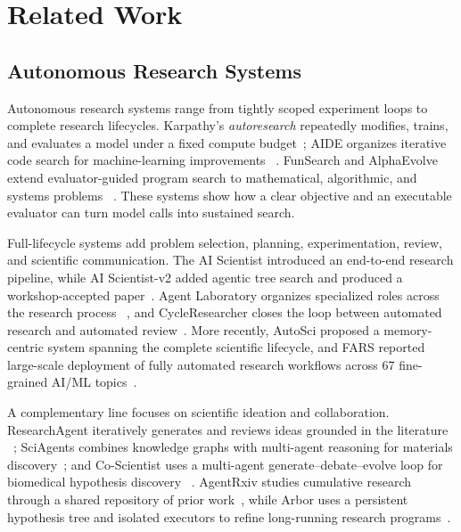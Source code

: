 \section{Related Work}
\label{sec:related}

\subsection{Autonomous Research Systems}

Autonomous research systems range from tightly scoped experiment loops to complete
research lifecycles. Karpathy's \emph{autoresearch} repeatedly modifies, trains, and
evaluates a model under a fixed compute budget~\citep{karpathy_autoresearch}; AIDE
organizes iterative code search for machine-learning improvements
~\citep{jiang2025aide}. FunSearch and AlphaEvolve extend evaluator-guided program
search to mathematical, algorithmic, and systems problems
~\citep{romera2024funsearch,novikov2025alphaevolve}. These systems show how a clear
objective and an executable evaluator can turn model calls into sustained search.

Full-lifecycle systems add problem selection, planning, experimentation, review,
and scientific communication. The AI Scientist introduced an end-to-end research
pipeline, while AI Scientist-v2 added agentic tree search and produced a
workshop-accepted paper~\citep{lu2024aiscientist,yamada2025aiscientistv2}. Agent
Laboratory organizes specialized roles across the research process
~\citep{schmidgall2025agentlab}, and CycleResearcher closes the loop between
automated research and automated review~\citep{weng2025cycleresearcher}. More
recently, AutoSci proposed a memory-centric system spanning the complete scientific
lifecycle, and FARS reported large-scale deployment of fully automated research
workflows across 67 fine-grained AI/ML topics~\citep{qian2026autosci,tang2026fars}.

A complementary line focuses on scientific ideation and collaboration.
ResearchAgent iteratively generates and reviews ideas grounded in the literature
~\citep{baek2024researchagent}; SciAgents combines knowledge graphs with multi-agent
reasoning for materials discovery~\citep{ghafarollahi2024sciagents}; and Co-Scientist
uses a multi-agent generate--debate--evolve loop for biomedical hypothesis discovery
~\citep{gottweis2025coscientist}. AgentRxiv studies cumulative research through a
shared repository of prior work~\citep{schmidgall2025agentrxiv}, while Arbor uses a
persistent hypothesis tree and isolated executors to refine long-running research
programs~\citep{jin2026arbor}.

